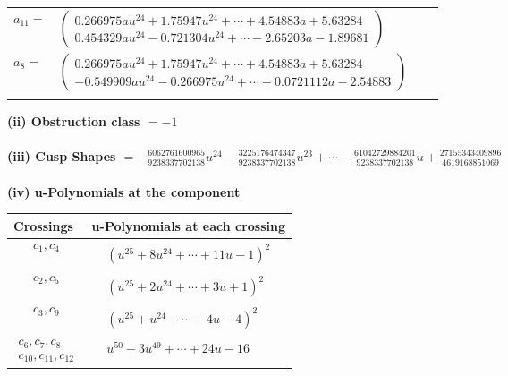 \documentclass[1p]{elsarticle_modified}
\theoremstyle{definition}
\begin{document}
\begin{tabular}{m{7pt} m{180pt} m{7pt} m{180pt} }
\flushright $a_{11}=$&$\begin{pmatrix}0.266975 a u^{24}+1.75947 u^{24}+\cdots+4.54883 a+5.63284\\0.454329 a u^{24}-0.721304 u^{24}+\cdots-2.65203 a-1.89681\end{pmatrix}$ \\
\flushright $a_{8}=$&$\begin{pmatrix}0.266975 a u^{24}+1.75947 u^{24}+\cdots+4.54883 a+5.63284\\-0.549909 a u^{24}-0.266975 u^{24}+\cdots+0.0721112 a-2.54883\end{pmatrix}$\\&\end{tabular}
\flushleft \textbf{(ii) Obstruction class $= -1$}\\~\\
\flushleft \textbf{(iii) Cusp Shapes $= -\frac{6062761600965}{9238337702138} u^{24}-\frac{3225176474347}{9238337702138} u^{23}+\cdots-\frac{61042729884201}{9238337702138} u+\frac{27155343409896}{4619168851069}$}\\~\\
\newpage\renewcommand{\arraystretch}{1}
\flushleft \textbf{(iv) u-Polynomials at the component}\newline \\
\begin{tabular}{m{50pt}|m{274pt}}
Crossings & \hspace{64pt}u-Polynomials at each crossing \\
\hline $$\begin{aligned}c_{1},c_{4}\end{aligned}$$&$\begin{aligned}
&(u^{25}+8 u^{24}+\cdots+11 u-1)^{2}
\end{aligned}$\\
\hline $$\begin{aligned}c_{2},c_{5}\end{aligned}$$&$\begin{aligned}
&(u^{25}+2 u^{24}+\cdots+3 u+1)^{2}
\end{aligned}$\\
\hline $$\begin{aligned}c_{3},c_{9}\end{aligned}$$&$\begin{aligned}
&(u^{25}+u^{24}+\cdots+4 u-4)^{2}
\end{aligned}$\\
\hline $$\begin{aligned}c_{6},c_{7},c_{8}\\c_{10},c_{11},c_{12}\end{aligned}$$&$\begin{aligned}
&u^{50}+3 u^{49}+\cdots+24 u-16
\end{aligned}$\\
\hline
\end{tabular}\\~\\
\end{document}
